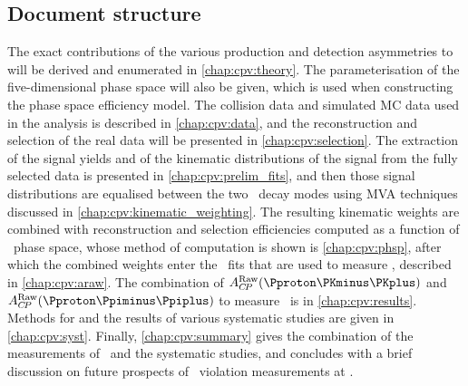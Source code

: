 \subsection{Document structure}
\label{chap:cpv:introduction:overview:structure}

The exact contributions of the various production and detection asymmetries to 
\ARaw will be derived and enumerated in \cref{chap:cpv:theory}.
The parameterisation of the five-dimensional phase space will also be given, 
which is used when constructing the phase space efficiency model.
The collision data and simulated \ac{MC} data used in the analysis is described 
in \cref{chap:cpv:data}, and the reconstruction and selection of the real data 
will be presented in \cref{chap:cpv:selection}.
The extraction of the signal yields and of the kinematic distributions of the 
signal from the fully selected data is presented in 
\cref{chap:cpv:prelim_fits}, and then those signal distributions are equalised 
between the two \PLambdac\ decay modes using \ac{MVA} techniques discussed in 
\cref{chap:cpv:kinematic_weighting}.
The resulting kinematic weights are combined with reconstruction and selection 
efficiencies computed as a function of \phh\ phase space, whose method of 
computation is shown is \cref{chap:cpv:phsp}, after which the combined weights 
enter the \chisq\ fits that are used to measure \ARaw, described in 
\cref{chap:cpv:araw}.
The combination of $\ARaw(\pKK)$ and $\ARaw(\ppipi)$ to measure \dACP\ is in 
\cref{chap:cpv:results}.
Methods for and the results of various systematic studies are given in 
\cref{chap:cpv:syst}.
Finally, \cref{chap:cpv:summary} gives the combination of the measurements of 
\dACP\ and the systematic studies, and concludes with a brief discussion on 
future prospects of \CP\ violation measurements at \lhcb.
